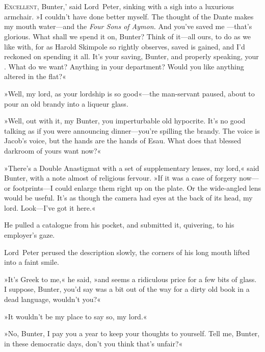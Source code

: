 \chapter[Chapter \thechapter]{}
\lettrine[lines=4,ante=‘]{E}{xcellent}, Bunter,' said Lord~Peter, sinking with a sigh into a luxurious armchair. »I couldn't have done better myself. The thought of the Dante makes my mouth water—and the \textit{Four Sons of Aymon.} And you've saved me —that's glorious. What shall we spend it on, Bunter? Think of it—all ours, to do as we like with, for as Harold Skimpole so rightly observes,  saved is  gained, and I'd reckoned on spending it all. It's your saving, Bunter, and properly speaking, your . What do we want? Anything in your department? Would you like anything altered in the flat?«

»Well, my lord, as your lordship is so good«---the man-servant paused, about to pour an old brandy into a liqueur glass.

»Well, out with it, my Bunter, you imperturbable old hypocrite. It's no good talking as if you were announcing dinner—you're spilling the brandy. The voice is Jacob's voice, but the hands are the hands of Esau. What does that blessed darkroom of yours want now?«

»There's a Double Anastigmat with a set of supplementary lenses, my lord,« said Bunter, with a note almost of religious fervour. »If it was a case of forgery now—or footprints—I could enlarge them right up on the plate. Or the wide-angled lens would be useful. It's as though the camera had eyes at the back of its head, my lord. Look—I've got it here.«

He pulled a catalogue from his pocket, and submitted it, quivering, to his employer's gaze.

Lord~Peter perused the description slowly, the corners of his long mouth lifted into a faint smile.

»It's Greek to me,« he said, »and  seems a ridiculous price for a few bits of glass. I suppose, Bunter, you'd say  was a bit out of the way for a dirty old book in a dead language, wouldn't you?«

»It wouldn't be my place to say so, my lord.«

»No, Bunter, I pay you  a year to keep your thoughts to yourself. Tell me, Bunter, in these democratic days, don't you think that's unfair?«

